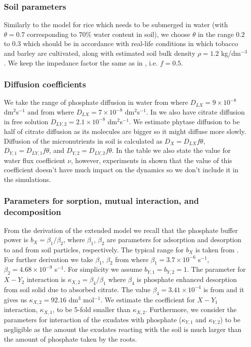 \documentclass[11pt]{article}
\begin{document}
\subsubsection{Soil parameters}
Similarly to the model for rice \cite{Ptashnyk-2011} which needs to be submerged in water (with $\theta=0.7$ corresponding to $70\%$ water content in soil), we choose $\theta$ in the range $0.2$ to $0.3$ which should be in accordance with real-life conditions in which tobacco and barley are cultivated, along with estimated soil bulk density $\rho=1.2$ kg/dm$^{-3}$. We keep the impedance factor the same as in \cite{Ptashnyk-2011}, i.e. $f=0.5$.

\subsubsection{Diffusion coefficients}
We take the range of phosphate diffusion in water from \cite{Ptashnyk-2010} where $D_{LX} = 9 \times 10^{-8}$ dm$^2$s$^{-1}$ and from \cite{McKayFletcher-2019} where $D_{LX} = 7 \times 10^{-8}$ dm$^2$s$^{-1}$. In \cite{McKayFletcher-2019} we also have citrate diffusion in free solution $D_{LY,2} = 2.1 \times 10^{-8}$ dm$^2$s$^{-1}$. We estimate phytase diffusion to be half of citrate diffusion as its molecules are bigger so it might diffuse more slowly. Diffusion of the micronutrients in soil is calculated as $D_X = D_{LX}f\theta$, $D_{Y,1} = D_{LY,1}f\theta$, and $D_{Y,2} = D_{LY,2}f\theta$. In the table we also state the value for water flux coefficient $\nu$, however, experiments in \cite{Ptashnyk-2011} shown that the value of this coefficient doesn't have much impact on the dynamics so we don't include it in the simulations.

\subsubsection{Parameters for sorption, mutual interaction, and decomposition}
From the derivation of the extended model we recall that the phosphate buffer power is $b_X = \beta_1 / \beta_2$, where $\beta_1$, $\beta_2$ are parameters for adsorption and desorption to and from soil particles, respectively. The typical range for $b_X$ is taken from \cite{Ptashnyk-2010}. For further derivation we take $\beta_1$, $\beta_2$ from \cite{Ptashnyk-2010} where $\beta_1 = 3.7 \times 10^{-6}$ s$^{-1}$, $\beta_2 = 4.68 \times 10^{-9}$ s$^{-1}$. For simplicity we assume $b_{Y,1}=b_{Y,2} = 1$. The parameter for $X-Y_2$ interaction is $\kappa_{X,2} = \beta_4 / \beta_1$ where $\beta_4$ is phosphate enhanced desorption from soil solid due to absorbed citrate. The value $\beta_4 = 3.41 \times 10^{-4}$ is from \cite{McKayFletcher-2019} and it gives us $\kappa_{X,2} = 92.16$ dm$^3$ mol$^{-1}$. We estimate the coefficient for $X-Y_1$ interaction, $\kappa_{X,1}$, to be 5-fold smaller than $\kappa_{X,2}$. Furthermore, we consider the parameters for interaction of the exudates with phosphate ($\kappa_{Y,1}$ and $\kappa_{Y,2}$) to be negligible as the amount the exudates reacting with the soil is much larger than the amount of phosphate taken by the roots. 
\end{document}

